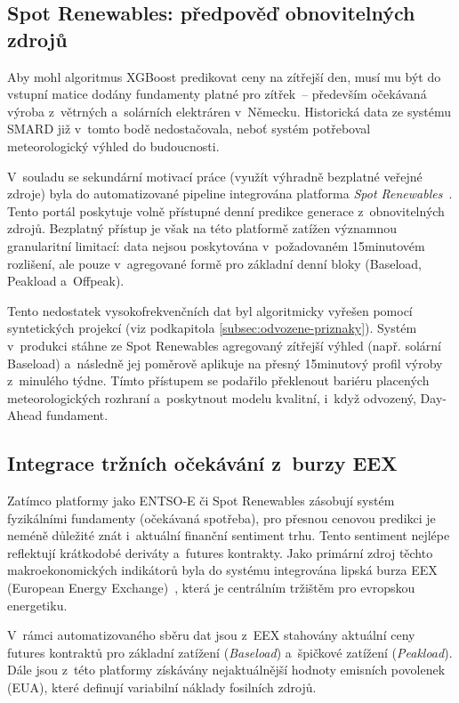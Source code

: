 \documentclass[a4paper]{article}
\begin{document}
\subsection{Spot Renewables: předpověď obnovitelných zdrojů}
\label{subsec:spot-renewables}
Aby mohl algoritmus XGBoost predikovat ceny na zítřejší den, musí mu být do vstupní matice dodány fundamenty platné pro zítřek~-- především očekávaná výroba z~větrných a~solárních elektráren v~Německu. Historická data ze systému SMARD již v~tomto bodě nedostačovala, neboť systém potřeboval meteorologický výhled do budoucnosti.

V~souladu se sekundární motivací práce (využít výhradně bezplatné veřejné zdroje) byla do automatizované pipeline integrována platforma \textit{Spot Renewables}~\cite{spot-renewables}. Tento portál poskytuje volně přístupné denní predikce generace z~obnovitelných zdrojů. Bezplatný přístup je však na této platformě zatížen významnou granularitní limitací: data nejsou poskytována v~požadovaném 15minutovém rozlišení, ale pouze v~agregované formě pro základní denní bloky (Baseload, Peakload a~Offpeak).

Tento nedostatek vysokofrekvenčních dat byl algoritmicky vyřešen pomocí syntetických projekcí (viz podkapitola \ref{subsec:odvozene-priznaky}). Systém v~produkci stáhne ze Spot Renewables agregovaný zítřejší výhled (např. solární Baseload) a~následně jej poměrově aplikuje na přesný 15minutový profil výroby z~minulého týdne. Tímto přístupem se podařilo překlenout bariéru placených meteorologických rozhraní a~poskytnout modelu kvalitní, i~když odvozený, Day-Ahead fundament.

\subsection{Integrace tržních očekávání z~burzy EEX}
Zatímco platformy jako ENTSO-E či Spot Renewables zásobují systém fyzikálními fundamenty (očekávaná spotřeba), pro přesnou cenovou predikci je neméně důležité znát i~aktuální finanční sentiment trhu. Tento sentiment nejlépe reflektují krátkodobé deriváty a~futures kontrakty. Jako primární zdroj těchto makroekonomických indikátorů byla do systému integrována lipská burza EEX (European Energy Exchange)~\cite{eex}, která je centrálním tržištěm pro evropskou energetiku.

V~rámci automatizovaného sběru dat jsou z~EEX stahovány aktuální ceny futures kontraktů pro základní zatížení (\textit{Baseload}) a~špičkové zatížení (\textit{Peakload}). Dále jsou z~této platformy získávány nejaktuálnější hodnoty emisních povolenek (EUA), které definují variabilní náklady fosilních zdrojů.
\end{document}
